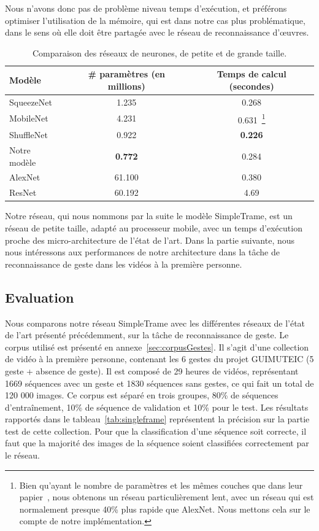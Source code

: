 Nous n'avons donc pas de problème niveau temps d'exécution, et préférons optimiser l'utilisation de la mémoire, qui est dans notre cas plus problématique, dans le sens où elle doit être partagée avec le réseau de reconnaissance d'œuvres.

\begin{table}
\centering
\begin{tabular}{|l|c|c|}
\hline
\hline
Modèle & \# paramètres (en millions) & Temps de calcul (secondes) \\
\hline
SqueezeNet & 1.235 & 0.268 \\
\hline
MobileNet & 4.231 & 0.631~\footnote{Bien qu'ayant le nombre de paramètres et les mêmes couches que dans leur papier~\cite{howard2017mobilenets}, nous obtenons un réseau particulièrement lent, avec un réseau qui est normalement presque 40\% plus rapide que AlexNet. Nous mettons cela sur le compte de notre implémentation.} \\
\hline
ShuffleNet & 0.922 & \textbf{0.226} \\
\hline
Notre modèle & \textbf{0.772} & 0.284 \\
\hline
\hline
AlexNet & 61.100 & 0.380 \\
\hline
ResNet & 60.192 & 4.69 \\
\hline
\end{tabular}
\caption{Comparaison des réseaux de neurones, de petite et de grande taille.}
\label{tab:networkscomparison}
\end{table}

Notre réseau, qui nous nommons par la suite le modèle SimpleTrame, est un réseau de petite taille, adapté au processeur mobile, avec un temps d'exécution proche des micro-architecture de l'état de l'art.
Dans la partie suivante, nous nous intéressons aux performances de notre architecture dans la tâche de reconnaissance de geste dans les vidéos à la première personne.

\subsection{Evaluation}

Nous comparons notre réseau SimpleTrame avec les différentes réseaux de l'état de l'art présenté précédemment, sur la tâche de reconnaissance de geste.
Le corpus utilisé est présenté en annexe~\ref{sec:corpusGestes}. 
Il s'agit d'une collection de vidéo à la première personne, contenant les 6 gestes du projet GUIMUTEIC (5 geste + absence de geste).
Il est composé de 29 heures de vidéos, représentant 1669 séquences avec un geste et 1830 séquences sans gestes, ce qui fait un total de 120 000 images.
Ce corpus est séparé en trois groupes, 80\% de séquences d'entraînement, 10\% de séquence de validation et 10\% pour le test.
Les résultats rapportés dans le tableau~\ref{tab:singleframe} représentent la précision sur la partie test de cette collection.
Pour que la classification d'une séquence soit correcte, il faut que la majorité des images de la séquence soient classifiées correctement par le réseau.

